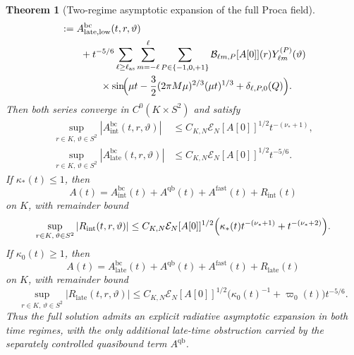 \documentclass[12pt]{article}
\numberwithin{equation}{section}
\theoremstyle{plain}
\newtheorem{theorem}{Theorem}[section]
\theoremstyle{definition}
\theoremstyle{remark}
\newcommand{\bc}{\mathrm{bc}}
\newcommand{\qb}{\mathrm{qb}}
\newcommand{\fast}{\mathrm{fast}}
\newcommand{\vp}{\varpi}
\newcommand{\kap}{\kappa}
\newcommand{\abs}[1]{\left|#1\right|}
\begin{document}
\begin{theorem}[Two-regime asymptotic expansion of the full Proca field]
\begin{align}
   &:=
   A^{\bc}_{\mathrm{late,low}}(t,r,\vartheta)
   \notag\\
   &\qquad+
   t^{-5/6}
   \sum_{\ell\ge\ell_{\mathrm{as}}}\sum_{m=-\ell}^{\ell}\sum_{P\in\{-1,0,+1\}}
   \mathcal B_{\ell m,P}[A[0]](r)
   Y^{(P)}_{\ell m}(\vartheta)
   \notag\\
   &\qquad\qquad\times
   \sin\!\Bigl(
      \mu t
      -\frac32(2\pi M\mu)^{2/3}(\mu t)^{1/3}
      +\delta_{\ell,P,0}(Q)
   \Bigr).
   \label{eq:intro_full_late_profile}
\end{align}
Then both series converge in $C^0(K\times S^2)$ and satisfy
\begin{align}
   \sup_{r\in K,\,\vartheta\in S^2}
   \abs{A^{\bc}_{\mathrm{int}}(t,r,\vartheta)}
   &\le
   C_{K,N}\mathcal E_N[A[0]]^{1/2}t^{-(\nu_*+1)},
   \label{eq:intro_profile_bounds_a}
   \\
   \sup_{r\in K,\,\vartheta\in S^2}
   \abs{A^{\bc}_{\mathrm{late}}(t,r,\vartheta)}
   &\le
   C_{K,N}\mathcal E_N[A[0]]^{1/2}t^{-5/6}.
   \label{eq:intro_profile_bounds_b}
\end{align}
If $\kap_*(t)\le1$, then
\begin{equation}\label{eq:intro_full_intermediate_expansion}
   A(t)=A^{\bc}_{\mathrm{int}}(t)+A^{\qb}(t)+A^{\fast}(t)+R_{\mathrm{int}}(t)
\end{equation}
on $K$, with remainder bound
\begin{equation}\label{eq:intro_full_intermediate_remainder}
   \sup_{r\in K,\,\vartheta\in S^2}\abs{R_{\mathrm{int}}(t,r,\vartheta)}
   \le
   C_{K,N}\mathcal E_N[A[0]]^{1/2}
   \Bigl(
      \kap_*(t)t^{-(\nu_*+1)}
      +
      t^{-(\nu_*+2)}
   \Bigr).
\end{equation}
If $\kap_0(t)\ge1$, then
\begin{equation}\label{eq:intro_full_late_expansion}
   A(t)=A^{\bc}_{\mathrm{late}}(t)+A^{\qb}(t)+A^{\fast}(t)+R_{\mathrm{late}}(t)
\end{equation}
on $K$, with remainder bound
\begin{equation}\label{eq:intro_full_late_remainder}
   \sup_{r\in K,\,\vartheta\in S^2}\abs{R_{\mathrm{late}}(t,r,\vartheta)}
   \le
   C_{K,N}\mathcal E_N[A[0]]^{1/2}
   \bigl(\kap_0(t)^{-1}+\vp_0(t)\bigr)t^{-5/6}.
\end{equation}
Thus the full solution admits an explicit radiative asymptotic expansion in both time regimes, with the only additional late-time obstruction carried by the separately controlled quasibound term $A^{\qb}$.
\end{theorem}
\end{document}

